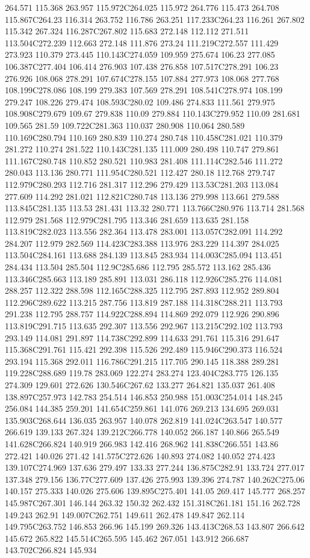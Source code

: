 264.571 115.368 263.957 115.972C264.025 115.972 264.776 115.473 264.708 115.867C264.23 116.314 263.752 116.786 263.251 117.233C264.23 116.261 267.802 115.342 267.324 116.287C267.802 115.683 272.148 112.112 271.511 113.504C272.239 112.663 272.148 111.876 273.24 111.219C272.557 111.429 273.923 110.379 273.445 110.143C274.059 109.959 275.674 106.23 277.085 106.387C277.404 106.414 276.903 107.438 276.858 107.517C278.291 106.23 276.926 108.068 278.291 107.674C278.155 107.884 277.973 108.068 277.768 108.199C278.086 108.199 279.383 107.569 278.291 108.541C278.974 108.199 279.247 108.226 279.474 108.593C280.02 109.486 274.833 111.561 279.975 108.908C279.679 109.67 279.838 110.09 279.884 110.143C279.952 110.09 281.681 109.565 281.59 109.722C281.363 110.037 280.908 110.064 280.589 110.169C280.794 110.169 280.839 110.274 280.748 110.458C281.021 110.379 281.272 110.274 281.522 110.143C281.135 111.009 280.498 110.747 279.861 111.167C280.748 110.852 280.521 110.983 281.408 111.114C282.546 111.272 280.043 113.136 280.771 111.954C280.521 112.427 280.18 112.768 279.747 112.979C280.293 112.716 281.317 112.296 279.429 113.53C281.203 113.084 277.609 114.292 281.021 112.821C280.748 113.136 279.998 113.661 279.588 113.845C281.135 113.53 281.431 113.32 280.771 113.766C280.976 113.714 281.568 112.979 281.568 112.979C281.795 113.346 281.659 113.635 281.158 113.819C282.023 113.556 282.364 113.478 283.001 113.057C282.091 114.292 284.207 112.979 282.569 114.423C283.388 113.976 283.229 114.397 284.025 113.504C284.161 113.688 284.139 113.845 283.934 114.003C285.094 113.451 284.434 113.504 285.504 112.9C285.686 112.795 285.572 113.162 285.436 113.346C285.663 113.189 285.891 113.031 286.118 112.926C285.276 114.081 288.257 112.322 288.598 112.165C288.325 112.795 287.893 112.952 289.804 112.296C289.622 113.215 287.756 113.819 287.188 114.318C288.211 113.793 291.238 112.795 288.757 114.922C288.894 114.869 292.079 112.926 290.896 113.819C291.715 113.635 292.307 113.556 292.967 113.215C292.102 113.793 293.149 114.081 291.897 114.738C292.899 114.633 291.761 115.316 291.647 115.368C291.761 115.421 292.398 115.526 292.489 115.946C290.373 116.524 293.194 115.368 292.011 116.786C291.215 117.705 290.145 118.388 289.281 119.228C288.689 119.78 283.069 122.274 283.274 123.404C283.775 126.135 274.309 129.601 272.626 130.546C267.62 133.277 264.821 135.037 261.408 138.897C257.973 142.783 254.514 146.853 250.988 151.003C254.014 148.245 256.084 144.385 259.201 141.654C259.861 141.076 269.213 134.695 269.031 135.903C268.644 136.035 263.957 140.078 262.819 141.024C263.547 140.577 266.619 139.133 267.324 139.212C266.778 140.052 266.187 140.866 265.549 141.628C266.824 140.919 266.983 142.416 268.962 141.838C266.551 143.86 272.421 140.026 271.42 141.575C272.626 140.893 274.082 140.052 274.423 139.107C274.969 137.636 279.497 133.33 277.244 136.875C282.91 133.724 277.017 137.348 279.156 136.77C277.609 137.426 275.993 139.396 274.787 140.262C275.06 140.157 275.333 140.026 275.606 139.895C275.401 141.05 269.417 145.777 268.257 145.987C267.301 146.144 263.32 150.32 262.432 151.318C261.181 151.16 262.728 149.243 262.91 149.007C262.751 149.611 262.478 149.847 262.114 149.795C263.752 146.853 266.96 145.199 269.326 143.413C268.53 143.807 266.642 145.672 265.822 145.514C265.595 145.462 267.051 143.912 266.687 143.702C266.824 145.934 